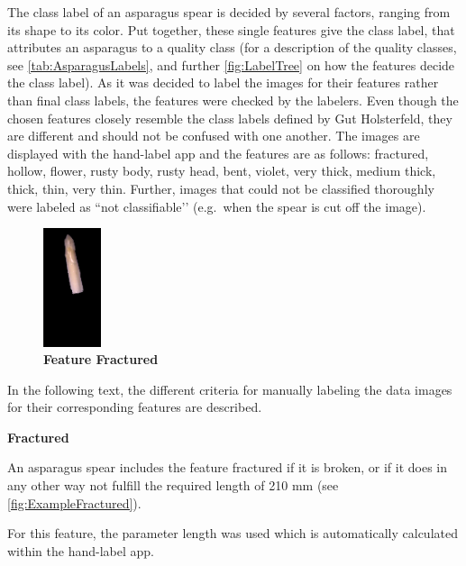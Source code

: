 The class label of an asparagus spear is decided by several factors, ranging from its shape to its color. Put together, these single features give the class label, that attributes an asparagus to a quality class (for a description of the quality classes, see \autoref{tab:AsparagusLabels}, and further \autoref{fig:LabelTree} on how the features decide the class label). As it was decided to label the images for their features rather than final class labels, the features were checked by the labelers. Even though the chosen features closely resemble the class labels defined by Gut Holsterfeld, they are different and should not be confused with one another. The images are displayed with the hand-label app and the features are as follows: fractured, hollow, flower, rusty body, rusty head, bent, violet, very thick, medium thick, thick, thin, very thin. Further, images that could not be classified thoroughly were labeled as ``not classifiable’’ (e.g.\ when the spear is cut off the image).

\begin{figure}
  \begin{center}
    \includegraphics[width=0.15\textwidth]{Figures/chapter03/example_img_fractured.png}
  \end{center}
  \vspace{-15pt}
  \caption[Example Image Feature Fractured]{ \textbf{Feature Fractured}}
  \vspace{-20pt}
  \label{fig:ExampleFractured}
\end{figure}

In the following text, the different criteria for manually labeling the data images for their corresponding features are described. 

\bigskip
\textbf{Fractured}

An asparagus spear includes the feature fractured if it is broken, or if it does in any other way not fulfill the required length of 210 mm (see \autoref{fig:ExampleFractured}).

For this feature, the parameter length was used which is automatically calculated within the hand-label app.

